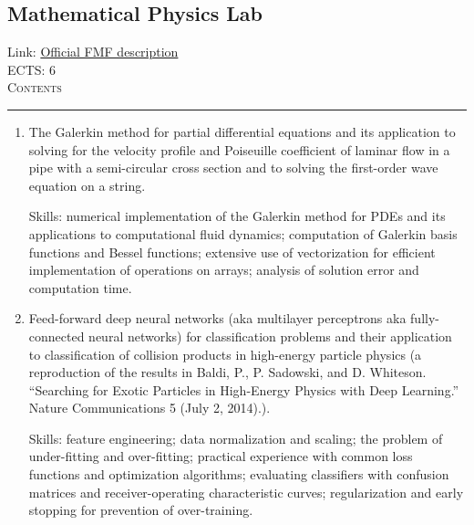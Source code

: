 \documentclass[11pt, a4paper]{article}
\newenvironment{course}[3]{
\subsection{#1}%
Link: \href{#2}{Official FMF description}\\%
ECTS: #3%
\vspace{1ex}
\\
{\large \textsc{Contents}}\\[-0.9ex]%
\rule{\textwidth}{0.5pt}
\vspace{-3ex}
}
{}
\newenvironment{chapter}[1]{
\begin{tcolorbox}[title=#1, breakable]
}
{\end{tcolorbox}}
\begin{document}
\begin{course}{Mathematical Physics Lab}{https://www.fmf.uni-lj.si/en/study-physics/programmes/1fiz/2020/7000777/courses/1159/}{6}
\begin{chapter}{Projects}
\begin{enumerate}
            Skills: numerical implementation of the Crank-Nicolson method for PDEs; unitary approximations of the Hamiltonian operator;
            Padé approximation of the exponential function and implementation of higher-order position and time generalizations of the Crank-Nicolson method (a reproduction of the results in W. van Dijk and F. M. Toyama. ``Accurate numerical solutions of the time-dependent Schrödinger equation.'' Phys. Rev. E \textbf{75}, 036707 (2007).);
            analysis of computation time and solution accuracy.

            \item The Galerkin method for partial differential equations and its application to solving for the velocity profile and Poiseuille coefficient of laminar flow in a pipe with a semi-circular cross section and to solving the first-order wave equation on a string.

            Skills: numerical implementation of the Galerkin method for PDEs and its applications to computational fluid dynamics; computation of Galerkin basis functions and Bessel functions; extensive use of vectorization for efficient implementation of operations on arrays; analysis of solution error and computation time.

            \item Feed-forward deep neural networks (aka multilayer perceptrons aka fully-connected neural networks) for classification problems and their application to classification of collision products in high-energy particle physics (a reproduction of the results in Baldi, P., P. Sadowski, and D. Whiteson. “Searching for Exotic Particles in High-Energy Physics with Deep Learning.” Nature Communications 5 (July 2, 2014).).

            Skills: feature engineering; data normalization and scaling; the problem of under-fitting and over-fitting; practical experience with common loss functions and optimization algorithms; evaluating classifiers with confusion matrices and receiver-operating characteristic curves; regularization and early stopping for prevention of over-training.
        
        \end{enumerate}
    \end{chapter}
\end{course}
\end{document}
